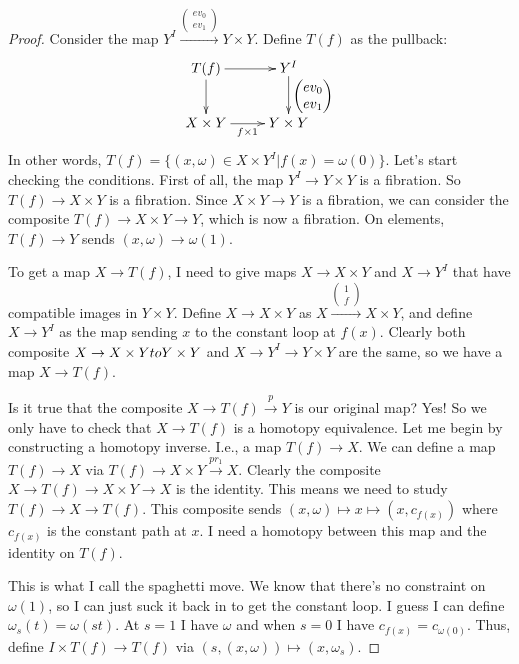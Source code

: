 \begin{proof}
    Consider the map $Y^I\xrightarrow{\begin{pmatrix} ev_0 \\ ev_1\end{pmatrix}}Y\times Y$. Define $T(f)$ as the pullback:
	\begin{equation*}
	    \xymatrix{
		T(f)\ar[r]\ar[d] & Y^I\ar[d]^{\begin{pmatrix}ev_0 \\ ev_1\end{pmatrix}}\\
		    X\times Y\ar[r]_{f\times 1} & Y\times Y
		}
	\end{equation*}
	In other words, $T(f)=\{(x,\omega)\in X\times Y^I|f(x) = \omega(0)\}$. Let's start checking the conditions. First of all, the map $Y^I\to Y\times Y$ is a fibration. So $T(f)\to X\times Y$ is a fibration. Since $X\times Y\to Y$ is a fibration, we can consider the composite $T(f)\to X\times Y\to Y$, which is now a fibration. On elements, $T(f)\to Y$ sends $(x,\omega)\to \omega(1)$.

	To get a map $X\to T(f)$, I need to give maps $X\to X\times Y$ and $X\to Y^I$ that have compatible images in $Y\times Y$. Define $X\to X\times Y$ as $X\xrightarrow{\begin{pmatrix} 1 \\ f\end{pmatrix}}X\times Y$, and define $X\to Y^I$ as the map sending $x$ to the constant loop at $f(x)$. Clearly both composite $X\to X\times Y\\to Y\times Y$ and $X\to Y^I\to Y\times Y$ are the same, so we have a map $X\to T(f)$.

	    Is it true that the composite $X\to T(f)\xrightarrow{p} Y$ is our original map? Yes! So we only have to check that $X\to T(f)$ is a homotopy equivalence. Let me begin by constructing a homotopy inverse. I.e., a map $T(f)\to X$. We can define a map $T(f)\to X$ via $T(f)\to X\times Y\xrightarrow{pr_1} X$. Clearly the composite $X\to T(f)\to X\times Y\to X$ is the identity. This means we need to study $T(f)\to X\to T(f)$. This composite sends $(x,\omega)\mapsto x\mapsto (x,c_{f(x)})$ where $c_{f(x)}$ is the constant path at $x$. I need a homotopy between this map and the identity on $T(f)$.

	    This is what I call the spaghetti move. We know that there's no constraint on $\omega(1)$, so I can just suck it back in to get the constant loop. I guess I can define $\omega_s(t) = \omega(st)$. At $s=1$ I have $\omega$ and when $s=0$ I have $c_{f(x)} = c_{\omega(0)}$. Thus, define $I\times T(f)\to T(f)$ via $(s,(x,\omega))\mapsto (x,\omega_s)$.


\end{proof}
